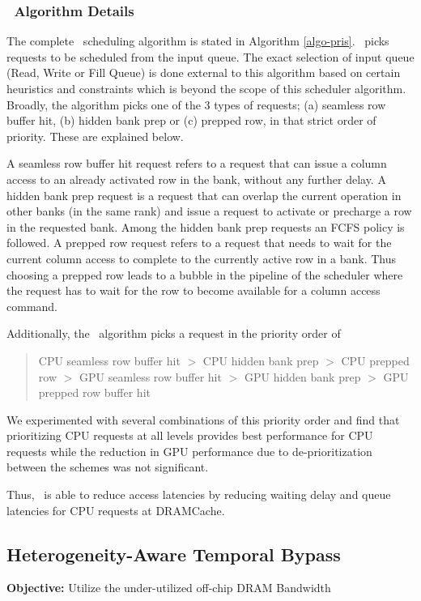 \subsubsection{\prioname\ Algorithm Details}
\par The complete \prioname\ scheduling algorithm is stated in Algorithm \ref{algo-pris}. \prioname\ picks requests to be scheduled from the input queue. The exact selection of input queue (Read, Write or Fill Queue) is done external to this algorithm based on certain heuristics and constraints which is beyond the scope of this scheduler algorithm. Broadly, the algorithm picks one of the 3 types of requests; (a) seamless row buffer hit, (b) hidden bank prep or (c) prepped row, in that strict order of priority. These are explained below.
\par A seamless row buffer hit request refers to a request that can issue a column access to an already activated row in the bank, without any further delay. A hidden bank prep request is a request that can overlap the current operation in other banks (in the same rank) and issue a request to activate or precharge a row in the requested bank. Among the hidden bank prep requests an FCFS policy is followed. A prepped row request refers to a request that needs to wait for the current column access to complete to the currently active row in a bank. Thus choosing a prepped row leads to a bubble in the pipeline of the scheduler where the request has to wait for the row to become available for a column access command.

\par Additionally, the \prioname\ algorithm picks a request in the priority order of
\begin{quote}
CPU seamless row buffer hit $>$ CPU hidden bank prep $>$ CPU prepped row $>$ GPU seamless row buffer hit $>$ GPU hidden bank prep $>$ GPU prepped row buffer hit
\end{quote}
We experimented with several combinations of this priority order and find that prioritizing CPU requests at all levels provides best performance for CPU requests while the reduction in GPU performance due to de-prioritization between the schemes was not significant.
\par Thus, \prioname\ is able to reduce access latencies by reducing waiting delay and queue latencies for CPU requests at DRAMCache.



\subsection{Heterogeneity-Aware Temporal Bypass} \label{mechanism-bye}
\textbf{Objective:} Utilize the under-utilized off-chip DRAM Bandwidth
